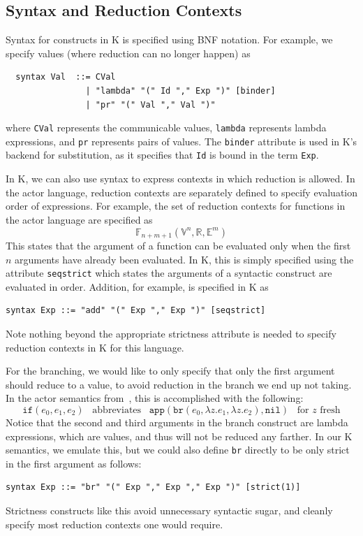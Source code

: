 \documentclass{llncs}
\begin{document}
\subsection{Syntax and Reduction Contexts}
Syntax for constructs in K is specified using BNF notation. For example, we
specify values (where reduction can no longer happen) as
\begin{verbatim}
  syntax Val  ::= CVal                                    
                | "lambda" "(" Id "," Exp ")" [binder]
                | "pr" "(" Val "," Val ")"
\end{verbatim}
where \texttt{CVal} represents the communicable values, \texttt{lambda}
represents lambda expressions, and \texttt{pr} represents pairs of values.  The
\texttt{binder} attribute is used in K's backend for substitution, as it
specifies that \texttt{Id} is bound in the term \texttt{Exp}.

In K, we can also use syntax to express contexts in which reduction is allowed.
In the actor language, reduction contexts are separately defined to specify
evaluation order of expressions. For example, the set of reduction contexts for
functions in the actor language are specified as
\[ \mathbb{F}_{n+m+1}(\mathbb{V}^n,\mathbb{R},\mathbb{E}^m) \]
This states that the argument of a function can be evaluated only when the first
$n$ arguments have already been evaluated. In K, this is simply specified using
the attribute \texttt{seqstrict} which states the arguments of a syntactic
construct are evaluated in order. Addition, for example, is specified in K as
\begin{verbatim}
syntax Exp ::= "add" "(" Exp "," Exp ")" [seqstrict]
\end{verbatim}
Note nothing beyond the appropriate strictness attribute is needed to specify
reduction contexts in K for this language.

For the branching, we would like to only specify that only the first argument
should reduce to a value, to avoid reduction in the branch we end up not taking.
In the actor semantics from~\cite{}, this is accomplished with the following:
\[ \texttt{if}(e_0, e_1, e_2) \;\;\;\text{abbreviates}\;\;\; \texttt{app}(\texttt{br}(e_0, \lambda z.e_1, \lambda z.e_2), \texttt{nil}) \;\;\;\text{for $z$ fresh} \]
Notice that the second and third arguments in the branch construct are lambda
expressions, which are values, and thus will not be reduced any farther. In our
K semantics, we emulate this, but we could also define \texttt{br} directly to
be only strict in the first argument as follows:
\begin{verbatim}
syntax Exp ::= "br" "(" Exp "," Exp "," Exp ")" [strict(1)]
\end{verbatim}
Strictness constructs like this avoid unnecessary syntactic sugar, and cleanly
specify most reduction contexts one would require.
\end{document}
